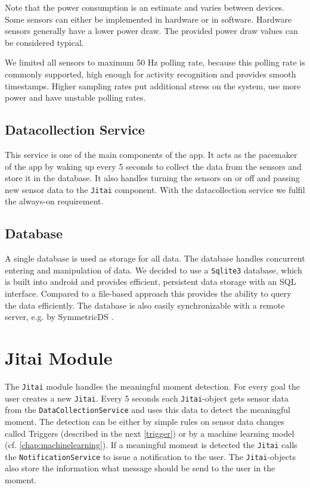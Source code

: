 \documentclass[a4paper]{report}
\begin{document}
%
Note that the power consumption is an estimate and varies between devices. Some sensors can either be implemented in hardware or in software. Hardware sensors generally have a lower power draw. The provided power draw values can be considered typical.

We limited all sensors to maximum 50 Hz polling rate, because this polling rate is commonly supported, high enough for activity recognition and provides smooth timestamps. Higher sampling rates put additional stress on the system, use more power and have unstable polling rates.

\subsection{Datacollection Service}\label{datacollector}
This service is one of the main components of the app. It acts as the pacemaker of the app by waking up every 5 seconds to collect the data from the sensors and store it in the database. It also handles turning the sensors on or off and passing new sensor data to the \texttt{Jitai} component. With the datacollection service we fulfil the always-on requirement.
\subsection{Database} A single database is used as storage for all data. The database handles concurrent entering and manipulation of data. 
We decided to use a \texttt{Sqlite3} database, which is built into android and provides efficient, persistent data storage with an SQL interface. Compared to a file-based approach this provides the ability to query the data efficiently. The database is also easily synchronizable with a remote server, e.g. by SymmetricDS .
\section{Jitai Module}

The \texttt{Jitai} module handles the meaningful moment detection. For every goal the user creates a new \texttt{Jitai}. Every 5 seconds each \texttt{Jitai}-object gets sensor data from the \texttt{DataCollectionService} and uses this data to detect the meaningful moment. The detection can be either by simple rules on sensor data changes called Triggers (described in the next \autoref{trigger}) or by a machine learning model (cf. \autoref{chap:machinelearning}). If a meaningful moment is detected the \texttt{Jitai} calls the \texttt{NotificationService} to issue a notification to the user. The \texttt{Jitai}-objects also store the information what message should be send to the user in the moment.
\end{document}
